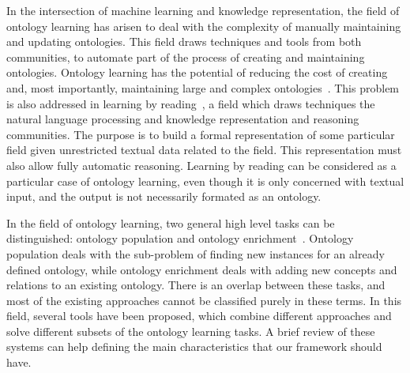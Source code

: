     In the intersection of machine learning and knowledge representation,
      the field of ontology learning has arisen to deal with the
      complexity of manually maintaining and updating ontologies.
      This field draws techniques and tools from both communities,
      to automate part of the process of creating and maintaining ontologies.
    Ontology learning has the potential of reducing the cost of creating
    and, most importantly, maintaining large and complex ontologies~\cite{cimiano2009ontology}.
      This problem is also addressed in
      learning by reading~\cite{barker2007learning}, a field which draws techniques
    the natural language processing and knowledge representation and reasoning communities.
    The purpose is to build a formal representation of some particular field given unrestricted
    textual data related to the field. This representation must also allow fully automatic
    reasoning.
      Learning by reading can be considered as a particular case of ontology learning,
      even though it is only concerned with textual input, and the
      output is not necessarily formated as an ontology.

      In the field of ontology learning, two general high level tasks can be distinguished:
      ontology population and ontology enrichment~\cite{petasis2011ontology}.
      Ontology population deals with the
      sub-problem of finding new instances for an already defined ontology, while
      ontology enrichment deals with adding new concepts and relations to an existing
      ontology. There is an overlap between these tasks, and most of the existing
      approaches cannot be classified purely in these terms.
      In this field, several tools have been proposed, which
      combine different approaches and solve different subsets of the ontology
      learning tasks. A brief review of these systems can help defining the
      main characteristics that our framework should have.

